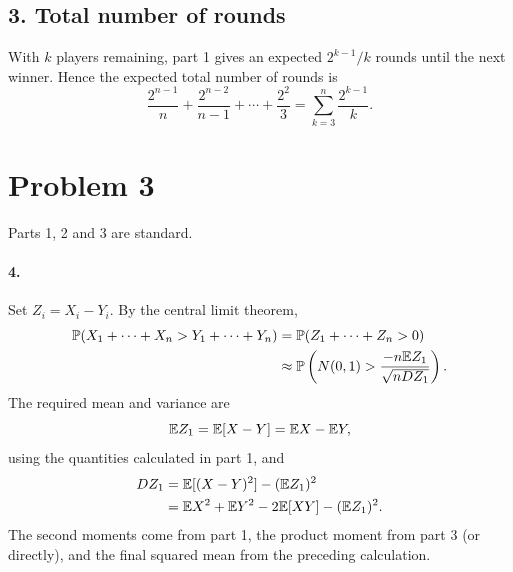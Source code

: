 \documentclass[11pt,a4paper]{article}
\begin{document}
\subsection*{3. Total number of rounds}
With $k$ players remaining, part 1 gives an expected $2^{k-1}/k$ rounds until the next winner. Hence the expected total number of rounds is
\[
\frac{2^{n-1}}n+\frac{2^{n-2}}{n-1}+\cdots+\frac{2^2}3
=\sum_{k=3}^n\frac{2^{k-1}}k.
\]

\section*{Problem 3}
Parts 1, 2 and 3 are standard.
\paragraph{4.} Set $Z_i=X_i-Y_i$. By the central limit theorem,
\begin{align*}
\mathbb P(X_1+\cdots+X_n>Y_1+\cdots+Y_n)
&=\mathbb P(Z_1+\cdots+Z_n>0)\\
&\approx\mathbb P\left(N(0,1)>\frac{-n\mathbb {E} Z_1}{\sqrt{nDZ_1}}\right).
\end{align*}
The required mean and variance are
\[
\mathbb {E} Z_1=\mathbb {E}[X-Y]=\mathbb {E} X-\mathbb {E} Y,
\]
using the quantities calculated in part 1, and
\begin{align*}
DZ_1&=\mathbb {E}[(X-Y)^2]-(\mathbb {E} Z_1)^2\\
&=\mathbb {E} X^2+\mathbb {E} Y^2-2\mathbb {E}[XY]-(\mathbb {E} Z_1)^2.
\end{align*}
The second moments come from part 1, the product moment from part 3 (or directly), and the final squared mean from the preceding calculation.
\end{document}
